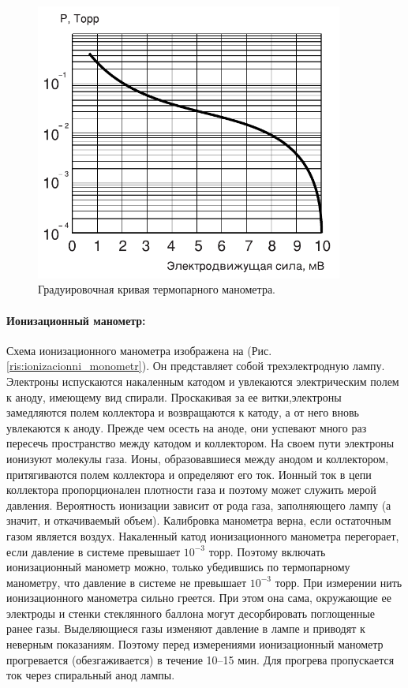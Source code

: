 \documentclass[a4paper, 12pt]{article}
\begin{document}
\begin{figure}[h]
\begin{minipage}{0.7\textwidth}
        \centering
        \includegraphics[width=0.9\textwidth]{termopara_graduirovka}
        \caption{Градуировочная кривая термопарного манометра.}
        \label{ris:termopara_graduirovka}
    \end{minipage}
    \end{figure}

    \newpage

    \paragraph{Ионизационный манометр:}
    Схема ионизационного манометра изображена на (Рис. \ref{ris:ionizacionni_monometr}). Он представляет собой трехэлектродную лампу. Электроны испускаются накаленным катодом и увлекаются электрическим полем к аноду, имеющему вид спирали. Проскакивая за ее витки,электроны замедляются полем коллектора и возвращаются к катоду, а от него вновь увлекаются к аноду. Прежде чем осесть на аноде, они успевают много раз пересечь пространство между катодом и коллектором. На своем пути электроны ионизуют молекулы газа. Ионы, образовавшиеся между анодом и коллектором, притягиваются полем коллектора и определяют его ток. Ионный ток в цепи коллектора пропорционален плотности газа и поэтому может служить мерой давления. Вероятность ионизации зависит от рода газа, заполняющего лампу (а значит, и откачиваемый объем). Калибровка манометра верна, если остаточным газом является воздух. Накаленный катод ионизационного манометра перегорает, если давление в системе превышает $10^{-3}$ торр. Поэтому включать ионизационный манометр можно, только убедившись по термопарному манометру, что давление в системе не превышает $10^{-3}$ торр. При измерении нить ионизационного манометра сильно греется. При этом она сама, окружающие ее электроды и стенки стеклянного баллона могут десорбировать поглощенные ранее газы. Выделяющиеся газы изменяют давление в лампе и приводят к неверным показаниям. Поэтому перед измерениями ионизационный манометр прогревается (обезгаживается) в течение 10–15 мин. Для прогрева пропускается ток через спиральный анод лампы.
\end{document}
